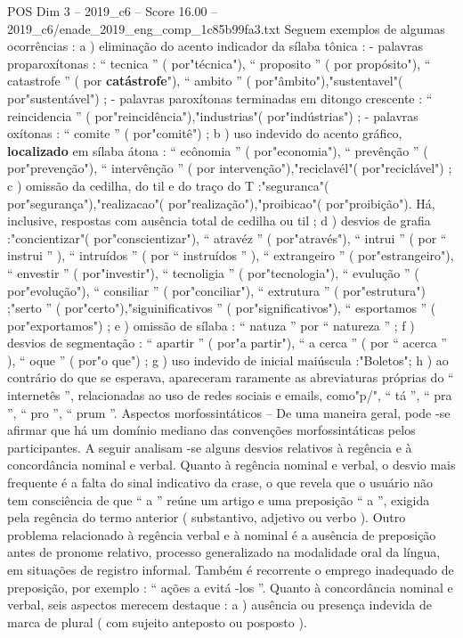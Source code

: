\begin{textsample}{POS Dim 3 – 2019\_c6 – Score 16.00 – 2019\_c6/enade\_2019\_eng\_comp\_1c85b99fa3.txt}
Seguem exemplos de algumas ocorrências : a ) eliminação do acento indicador da sílaba tônica : - palavras proparoxítonas : “ tecnica ” ( por"técnica"), “ proposito ” ( por propósito"), “ catastrofe ” ( por \textbf{catástrofe}"), “ ambito ” ( por"âmbito"),"sustentavel"( por"sustentável") ; - palavras paroxítonas terminadas em ditongo crescente : “ reincidencia ” ( por"reincidência"),"industrias"( por"indústrias") ; - palavras oxítonas : “ comite ” ( por"comitê") ; b ) uso indevido do acento gráfico, \textbf{localizado} em sílaba átona : “ ecônomia ” ( por"economia"), “ prevênção ” ( por"prevenção"), “ intervênção ” ( por intervenção"),"reciclavél"( por"reciclável") ; c ) omissão da cedilha, do til e do traço do T :"seguranca"( por"segurança"),"realizacao"( por"realização"),"proibicao"( por"proibição").
Há, inclusive, respostas com ausência total de cedilha ou til ; d ) desvios de grafia :"concientizar"( por"conscientizar"), “ atravéz ” ( por"através"), “ intrui ” ( por “ instrui ” ), “ intruídos ” ( por “ instruídos ” ), “ extrangeiro ” ( por"estrangeiro"), “ envestir ” ( por"investir"), “ tecnoligia ” ( por"tecnologia"), “ evulução ” ( por"evolução"), “ consiliar ” ( por"conciliar"), “ extrutura ” ( por"estrutura") ;"serto ” ( por"certo"),"siguinificativos ” ( por"significativos"), “ esportamos ” ( por"exportamos") ; e ) omissão de sílaba : “ natuza ” por “ natureza ” ; f ) desvios de segmentação : “ apartir ” ( por"a partir"), “ a cerca ” ( por “ acerca ” ), “ oque ” ( por"o que") ; g ) uso indevido de inicial maiúscula :"Boletos"; h ) ao contrário do que se esperava, apareceram raramente as abreviaturas próprias do “ internetês ”, relacionadas ao uso de redes sociais e emails, como"p/", “ tá ”, “ pra ”, “ pro ”, “ prum ”.
Aspectos morfossintáticos – De uma maneira geral, pode -se afirmar que há um domínio mediano das convenções morfossintáticas pelos participantes.
A seguir analisam -se alguns desvios relativos à regência e à concordância nominal e verbal.
Quanto à regência nominal e verbal, o desvio mais frequente é a falta do sinal indicativo da crase, o que revela que o usuário não tem consciência de que “ a ” reúne um artigo e uma preposição “ a ”, exigida pela regência do termo anterior ( substantivo, adjetivo ou verbo ).
Outro problema relacionado à regência verbal e à nominal é a ausência de preposição antes de pronome relativo, processo generalizado na modalidade oral da língua, em situações de registro informal.
Também é recorrente o emprego inadequado de preposição, por exemplo : “ ações a evitá -los ”.
Quanto à concordância nominal e verbal, seis aspectos merecem destaque : a ) ausência ou presença indevida de marca de plural ( com sujeito anteposto ou posposto ).

\end{textsample}
